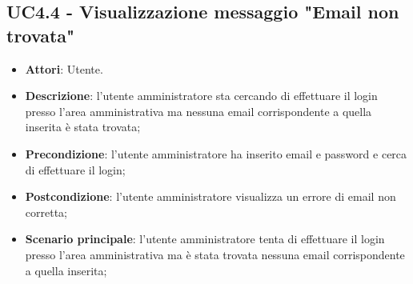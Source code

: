 \documentclass[../AnalisiDeiRequisiti_v3.0.0.tex]{subfiles}
\begin{document}
\subsection{UC4.4 - Visualizzazione messaggio "Email non trovata"} 
\label{sssec:UC4.4} 
\begin{itemize} 
\item \textbf{Attori}: Utente.
\item \textbf{Descrizione}: l'utente amministratore sta cercando di effettuare il login presso l'area amministrativa ma nessuna email corrispondente a quella inserita è stata trovata;
\item \textbf{Precondizione}: l'utente amministratore ha inserito email e password e cerca di effettuare il login;
\item \textbf{Postcondizione}: l'utente amministratore visualizza un errore di email non corretta;
\item \textbf{Scenario principale}: l'utente amministratore tenta di effettuare il login presso l'area amministrativa ma è stata trovata nessuna email corrispondente a quella inserita;
\newpage
\end{itemize} 
\end{document}
